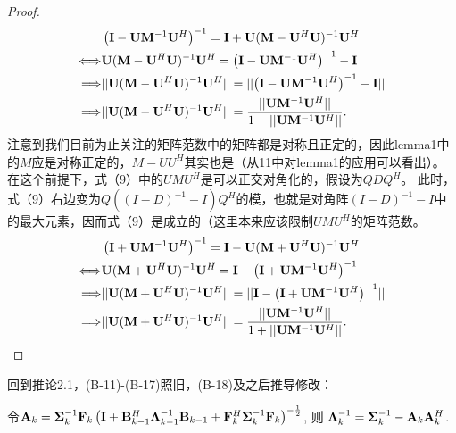 \documentclass[a4paper,11pt]{article}
\newcommand\V[1]{\mathrm{\bf{#1}}}
\newcommand\Nm[1]{\lvert\lvert #1\rvert\rvert}
\newcommand\SB[1]{\left(#1\right)}
\begin{document}
\begin{proof}
\begin{equation}
\begin{split}
&\SB{\V{I}-\V{U}\V{M}^{-1}\V{U}^H}^{-1}=\V{I}+\V{U}(\V{M}-\V{U}^H\V{U})^{-1}\V{U}^H\\
\Longleftrightarrow &\V{U}(\V{M}-\V{U}^H\V{U})^{-1}\V{U}^H=\SB{\V{I}-\V{U}\V{M}^{-1}\V{U}^H}^{-1}-\V{I}\\
\Longrightarrow &\Nm{\V{U}(\V{M}-\V{U}^H\V{U})^{-1}\V{U}^H}=\Nm{\SB{\V{I}-\V{U}\V{M}^{-1}\V{U}^H}^{-1}-\V{I}}\\
\Longrightarrow &\Nm{\V{U}(\V{M}-\V{U}^H\V{U})^{-1}\V{U}^H}=\frac{\Nm{\V{U}\V{M}^{-1}\V{U}^H}}{1-\Nm{\V{U}\V{M}^{-1}\V{U}^H}}.\\
\end{split}
\end{equation}
注意到我们目前为止关注的矩阵范数中的矩阵都是对称且正定的，因此lemma1中的$M$应是对称正定的，$M-UU^H$其实也是（从11中对lemma1的应用可以看出）。在这个前提下，式（9）中的$UMU^H$是可以正交对角化的，假设为$QDQ^H$。
此时，式（9）右边变为$Q((I-D)^{-1}-I)Q^H$的模，也就是对角阵$(I-D)^{-1}-I$中的最大元素，因而式（9）是成立的（这里本来应该限制$UMU^H$的矩阵范数。
\begin{equation}
\begin{split}
&\SB{\V{I}+\V{U}\V{M}^{-1}\V{U}^H}^{-1}=\V{I}-\V{U}(\V{M}+\V{U}^H\V{U})^{-1}\V{U}^H\\
\Longleftrightarrow &\V{U}(\V{M}+\V{U}^H\V{U})^{-1}\V{U}^H=\V{I}-\SB{\V{I}+\V{U}\V{M}^{-1}\V{U}^H}^{-1}\\
\Longrightarrow &\Nm{\V{U}(\V{M}+\V{U}^H\V{U})^{-1}\V{U}^H}=\Nm{\V{I}-\SB{\V{I}+\V{U}\V{M}^{-1}\V{U}^H}^{-1}}\\
\Longrightarrow &\Nm{\V{U}(\V{M}+\V{U}^H\V{U})^{-1}\V{U}^H}=\frac{\Nm{\V{U}\V{M}^{-1}\V{U}^H}}{1+\Nm{\V{U}\V{M}^{-1}\V{U}^H}}.\\
\end{split}
\end{equation}

\end{proof}
回到推论2.1，(B-11)-(B-17)照旧，(B-18)及之后推导修改：

令$\V{A}_k=\bm{\Sigma}^{-1}_k\V{F}_k\SB{\V{I}+\V{B}_{k-1}^H\bm{\Lambda}^{-1}_{k-1}\V{B}_{k-1}+\V{F}_k^H\bm{\Sigma}^{-1}_k\V{F}_k}^{-\frac{1}{2}}$, 则 $\bm{\Lambda}_k^{-1}=\bm{\Sigma}_k^{-1}-\V{A}_k\V{A}_k^H$.
\end{document}
